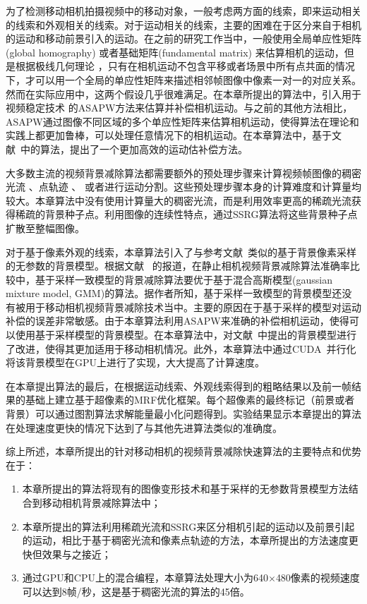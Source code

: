 为了检测移动相机拍摄视频中的移动对象，一般考虑两方面的线索，即来运动相关的线索和外观相关的线索。对于运动相关的线索，主要的困难在于区分来自于相机的运动和移动前景引入的运动。在之前的研究工作当中，一般使用全局单应性矩阵(global homography)\cite{5.8s,LiuCVPR09} 或者基础矩阵(fundamental matrix) \cite{kwak2011Generalized,LimPRFloating}来估算相机的运动，但是根据极线几何理论 \cite{Multitransform}，只有在相机运动不包含平移或者场景中所有点共面的情况下，才可以用一个全局的单应性矩阵来描述相邻帧图像中像素一对一的对应关系。然而在实际应用中，这两个假设几乎很难满足。在本章所提出的算法中，引入用于视频稳定技术\cite{Liu2009ASAP,Liu_2013ASAP} 的ASAPW方法来估算并补偿相机运动。与之前的其他方法相比，ASAPW通过图像不同区域的多个单应性矩阵来估算相机运动，使得算法在理论和实践上都更加鲁棒，可以处理任意情况下的相机运动。在本章算法中，基于文献~中的算法，提出了一个更加高效的运动估补偿方法。\par

大多数主流的视频背景减除算法都需要额外的预处理步骤来计算视频帧图像的稠密光流 \cite{Multitransform,gbsuperpixel}、点轨迹 \cite{iccv2009,Cui2012,SubspaceTracking}、 或者进行运动分割\cite{kwak2011Generalized}。这些预处理步骤本身的计算难度和计算量均较大。本章算法中没有使用计算量大的稠密光流，而是利用效率更高的稀疏光流获得稀疏的背景种子点。利用图像的连续性特点，通过SSRG算法将这些背景种子点扩散至整幅图像。\par

对于基于像素外观的线索，本章算法引入了与参考文献~类似的基于背景像素采样的无参数的背景模型。根据文献
 ~的报道，在静止相机视频背景减除算法准确率比较中，基于采样一致模型的背景减除算法要优于基于混合高斯模型(gaussian mixture model, GMM)的算法。据作者所知，基于采样一致模型的背景模型还没有被用于移动相机视频背景减除技术当中。主要的原因在于基于采样的模型对运动补偿的误差非常敏感。由于本章算法利用ASAPW来准确的补偿相机运动，使得可以使用基于采样模型的背景模型。在本章算法中，对文献~中提出的背景模型进行了改进，使得其更加适用于移动相机情况。此外，本章算法中通过CUDA~\cite{CUDA}并行化将该背景模型在GPU上进行了实现，大大提高了计算速度。\par

 在本章提出算法的最后，在根据运动线索、外观线索得到的粗略结果以及前一帧结果的基础上建立基于超像素的MRF优化框架。每个超像素的最终标记（前景或者背景）可以通过图割算法\cite{graphcut04}求解能量最小化问题得到。实验结果显示本章提出的算法在处理速度更快的情况下达到了与其他先进算法类似的准确度。


综上所述，本章所提出的针对移动相机的视频背景减除快速算法的主要特点和优势在于：
\begin{enumerate}
\item 本章所提出的算法将现有的图像变形技术和基于采样的无参数背景模型方法结合到移动相机背景减除算法中；
\item 本章所提出的算法利用稀疏光流和SSRG来区分相机引起的运动以及前景引起的运动，相比于基于稠密光流和像素点轨迹的方法，本章所提出的方法速度更快但效果与之接近；
\item 通过GPU和CPU上的混合编程，本章算法处理大小为640$\times$480像素的视频速度可以达到8帧/秒，这是基于稠密光流的算法\cite{gbsuperpixel}的45倍。
\end{enumerate}


